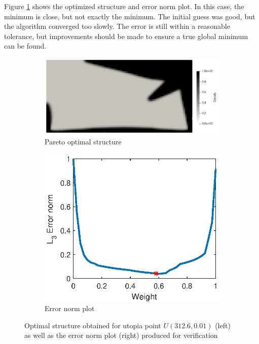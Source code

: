 Figure \ref{fig:test_case_three_pareto_optimum} shows the optimized structure and error norm plot. In this case, the minimum is close, but not exactly the minimum. The initial guess was good, but the algorithm converged too slowly. The error is still within a reasonable tolerance, but improvements should be made to ensure a true global minimum can be found.
\begin{figure}[ht]
    \centering
    \hfill
    \begin{subfigure}[b]{0.5\linewidth}
        \includegraphics[width=\linewidth]{figures/chapter_6/Case3_ParetoOptimum.png}
        \caption{Pareto optimal structure}
    \end{subfigure}
    \hfill
    \begin{subfigure}[b]{0.3\linewidth}
        \includegraphics[width=\linewidth]{figures/chapter_6/Case3_ErrorNormPlot.eps}
        \caption{Error norm plot}
    \end{subfigure}
    \hfill
    \caption{Optimal structure obtained for utopia point $U(312.6,0.01)$ (left) as well as the error norm plot (right) produced for verification}
    \label{fig:test_case_three_pareto_optimum}
\end{figure}


